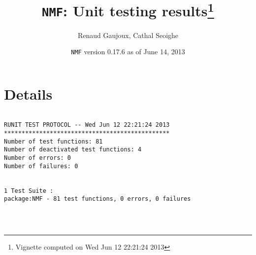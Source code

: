 \documentclass[10pt]{article}\usepackage[]{graphicx}\usepackage[]{color}
\author{Renaud Gaujoux, Cathal Seoighe}
\title{\texttt{NMF}: Unit testing results\footnote{Vignette computed  on Wed Jun 12 22:21:24 2013}}
\date{\texttt{NMF} version 0.17.6 as of June 14, 2013}
\begin{document}
\maketitle

\section{Details}
\begin{verbatim}

RUNIT TEST PROTOCOL -- Wed Jun 12 22:21:24 2013 
*********************************************** 
Number of test functions: 81 
Number of deactivated test functions: 4 
Number of errors: 0 
Number of failures: 0 

 
1 Test Suite : 
package:NMF - 81 test functions, 0 errors, 0 failures




\end{verbatim}
\end{document}
